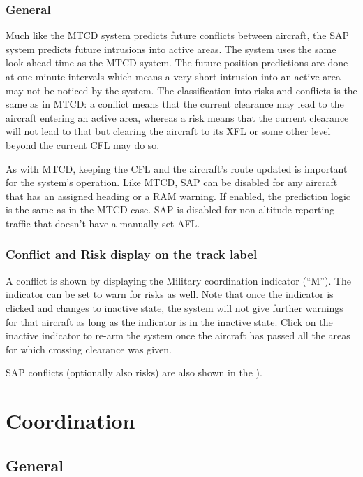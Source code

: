 \documentclass[11pt,a4paper]{memoir}
\begin{document}
\subsection*{General}

Much like the MTCD system predicts future conflicts between aircraft, the SAP system predicts future intrusions into active areas. The system uses the same look-ahead time as the MTCD system. The future position predictions are done at one-minute intervals which means a very short intrusion into an active area may not be noticed by the system. The classification into risks and conflicts is the same as in MTCD: a conflict means that the current clearance may lead to the aircraft entering an active area, whereas a risk means that the current clearance will not lead to that but clearing the aircraft to its XFL or some other level beyond the current CFL may do so.

As with MTCD, keeping the CFL and the aircraft’s route updated is important for the system’s operation. Like MTCD, SAP can be disabled for any aircraft that has an assigned heading or a RAM warning. If enabled, the prediction logic is the same as in the MTCD case. SAP is disabled for non-altitude reporting traffic that doesn’t have a manually set AFL.

\subsection*{Conflict and Risk display on the track label}

A conflict is shown by displaying the Military coordination indicator (“M”). The indicator can be set to warn for risks as well. Note that once the indicator is clicked and changes to inactive state, the system will not give further warnings for that aircraft as long as the indicator is in the inactive state. Click on the inactive indicator to re-arm the system once the aircraft has passed all the areas for which crossing clearance was given.

SAP conflicts (optionally also risks) are also shown in the \textit{}).

\chapter{Coordination}

\section{General}
\end{document}
